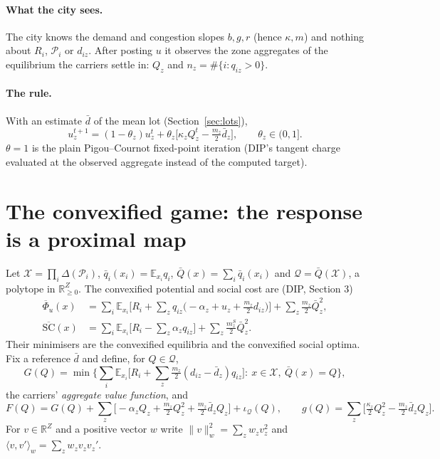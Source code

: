 \documentclass[11pt]{article}
\theoremstyle{definition}
\theoremstyle{remark}
\newcommand{\R}{\mathbb{R}}
\newcommand{\cP}{\mathcal{P}}
\newcommand{\cQ}{\mathcal{Q}}
\newcommand{\cX}{\mathcal{X}}
\newcommand{\ip}[2]{\langle #1,#2\rangle}
\newcommand{\Qbar}{\bar Q}
\newcommand{\qbar}{\bar q}
\newcommand{\dbar}{\bar d}
\newcommand{\SCbar}{\overline{\mathrm{SC}}}
\newcommand{\Phibar}{\overline{\Phi}}
\newcommand{\norm}[2]{\|#1\|_{#2}}
\begin{document}
\paragraph{What the city sees.} The city knows the demand and congestion slopes $b,g,r$ (hence $\kappa,m$) and nothing about $R_i$, $\cP_i$ or $d_{iz}$. After posting $u$ it observes the zone aggregates of the equilibrium the carriers settle in: $Q_z$ and $n_z=\#\{i:q_{iz}>0\}$.

\paragraph{The rule.} With an estimate $\dbar$ of the mean lot (Section~\ref{sec:lots}),
\begin{equation}\label{eq:rule}
u^{t+1}_z=(1-\theta_z)u^t_z+\theta_z\Big[\kappa_zQ^t_z-\tfrac{m_z}{2}\dbar_z\Big],\qquad\theta_z\in(0,1].
\end{equation}
$\theta=1$ is the plain Pigou--Cournot fixed-point iteration (DIP's tangent charge evaluated at the observed aggregate instead of the computed target).

\section{The convexified game: the response is a proximal map}\label{sec:convex}

Let $\cX=\prod_i\Delta(\cP_i)$, $\qbar_i(x_i)=\mathbb E_{x_i}q_i$, $\Qbar(x)=\sum_i\qbar_i(x_i)$ and $\cQ=\Qbar(\cX)$, a polytope in $\R^Z_{\ge0}$. The convexified potential and social cost are (DIP, Section 3)
\begin{align*}\Phibar_u(x)&=\sum_i\mathbb E_{x_i}\Big[R_i+\sum_zq_{iz}\big(-\alpha_z+u_z+\tfrac{m_z}{2}d_{iz}\big)\Big]+\sum_z\tfrac{m_z}{2}\Qbar_z^2,\\
\SCbar(x)&=\sum_i\mathbb E_{x_i}\Big[R_i-\sum_z\alpha_zq_{iz}\Big]+\sum_z\tfrac{m^S_z}{2}\Qbar_z^2 .\end{align*}
Their minimisers are the convexified equilibria and the convexified social optima. Fix a reference $\dbar$ and define, for $Q\in\cQ$,
\begin{equation}\label{eq:G}
G(Q)=\min\Big\{\sum_i\mathbb E_{x_i}\Big[R_i+\sum_z\tfrac{m_z}{2}(d_{iz}-\dbar_z)q_{iz}\Big]:\ x\in\cX,\ \Qbar(x)=Q\Big\},
\end{equation}
the carriers' \emph{aggregate value function}, and
\begin{equation}\label{eq:F}
F(Q)=G(Q)+\sum_z\Big[-\alpha_zQ_z+\tfrac{m_z}{2}Q_z^2+\tfrac{m_z}{2}\dbar_zQ_z\Big]+\iota_{\cQ}(Q),\qquad
g(Q)=\sum_z\Big[\tfrac{\kappa_z}{2}Q_z^2-\tfrac{m_z}{2}\dbar_zQ_z\Big].
\end{equation}
For $v\in\R^Z$ and a positive vector $w$ write $\norm{v}{w}^2=\sum_zw_zv_z^2$ and $\ip{v}{v'}_w=\sum_zw_zv_zv_z'$.
\end{document}

